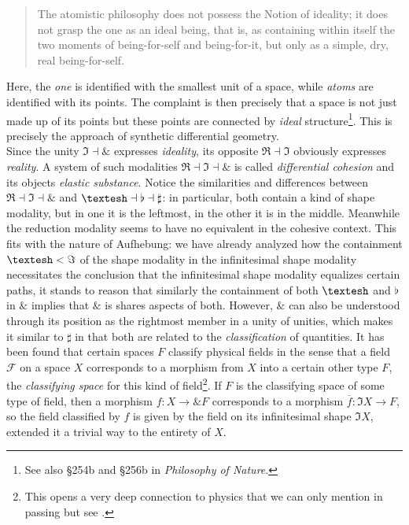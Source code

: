 \documentclass{article}
\begin{document}
\begin{quote}
    The atomistic philosophy does not possess the Notion of ideality; it does not grasp the one as an ideal being, that is, as containing within itself the two moments of being-for-self and being-for-it, but only as a simple, dry, real being-for-self.
\end{quote}

Here, the \emph{one} is identified with the smallest unit of a space, while \emph{atoms} are identified with its points. The complaint is then precisely that a space is not just made up of its points but these points are connected by \emph{ideal} structure\footnote{See also §254b and §256b in \emph{Philosophy of Nature}.}. This is precisely the approach of synthetic differential geometry. \\

Since the unity $\Im\dashv\&$ expresses \emph{ideality}, its opposite $\Re\dashv\Im$ obviously expresses \emph{reality}. A system of such modalities $\Re\dashv\Im\dashv\&$ is called \emph{differential cohesion} and its objects \emph{elastic substance}. Notice the similarities and differences between $\Re\dashv\Im\dashv\&$ and $\textrm{\textesh}\dashv\flat\dashv\sharp$: in particular, both contain a kind of shape modality, but in one it is the leftmost, in the other it is in the middle. Meanwhile the reduction modality seems to have no equivalent in the cohesive context. This fits with the nature of Aufhebung: we have already analyzed how the containment $\textrm{\textesh}<\Im$ of the shape modality in the infinitesimal shape modality necessitates the conclusion that the infinitesimal shape modality equalizes certain paths, it stands to reason that similarly the containment of both $\textrm{\textesh}$ and $\flat$ in $\&$ implies that $\&$ is shares aspects of both. However, $\&$ can also be understood through its position as the rightmost member in a unity of unities, which makes it similar to $\sharp$ in that both are related to the \emph{classification} of quantities. It has been found that certain spaces $F$ classify physical fields in the sense that a field $\mathcal{F}$ on a space $X$ corresponds to a morphism from $X$ into a certain other type $F$, the \emph{classifying space} for this kind of field\footnote{This opens a very deep connection to physics that we can only mention in passing but see \cite{dcct}.}. If $F$ is the classifying space of some type of field, then a morphism $f:X\rightarrow \& F$ corresponds to a morphism $\overline{f}:\Im X\rightarrow F$, so the field classified by $f$ is given by the field on its infinitesimal shape $\Im X$, extended it a trivial way to the entirety of $X$.   \\
\end{document}

